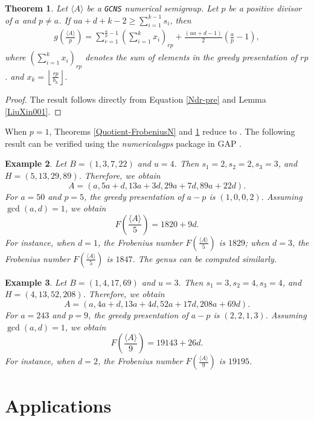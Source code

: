 \documentclass[reqno, 12pt]{article}
\newtheorem{thm}{Theorem}[section]
\theoremstyle{mydefinition}
\theoremstyle{myremark}
\newtheorem{exa}[thm]{Example}
\numberwithin{algorithm}{section}
\begin{document}
\begin{thm}\label{Quotient-Genusp}
Let $\langle A\rangle$ be a \texttt{GCNS} numerical semigroup. Let $p$ be a positive divisor of $a$ and $p\neq a$.
If $ua+d+k-2\geq \sum_{i=1}^{k-1}s_i$, then
\begin{align*}
g\left(\frac{\langle A\rangle}{p}\right)
=\sum_{r=1}^{\frac{a}{p}-1}\left(\sum_{i=1}^kx_i\right)_{rp}+\frac{(ua+d-1)}{2}\left(\frac{a}{p}-1\right),
\end{align*}
where $\left(\sum_{i=1}^{k}x_i\right)_{rp}$ denotes the sum of elements in the greedy presentation of $rp$. and $x_k=\left\lfloor \frac{rp}{b_k}\right\rfloor$.
\end{thm}
\begin{proof}
The result follows directly from Equation \eqref{Ndr-pre} and Lemma \ref{LiuXin001}.
\end{proof}


When $p=1$, Theorems \ref{Quotient-FrobeniusN} and \ref{Quotient-Genusp} reduce to \cite[Thoerems 2.12 and 2.13]{LiuSemigroupF}.
The following result can be verified using the \emph{numericalsgps} package in GAP \cite{M.Delgado}.

\begin{exa}
Let $B=(1,3,7,22)$ and $u=4$. Then $s_1=2,s_2=2,s_3=3$, and $H=(5,13,29,89)$. Therefore, we obtain
$$A=(a,5a+d,13a+3d,29a+7d,89a+22d).$$ 
For $a=50$ and $p=5$, the greedy presentation of $a-p$ is $(1,0,0,2)$.
Assuming $\gcd(a,d)=1$, we obtain
$$F\left(\frac{\langle A\rangle}{5}\right)=1820+9d.$$
For instance, when $d=1$, the Frobenius number $F\left(\frac{\langle A\rangle}{5}\right)$ is $1829$; when $d=3$, 
the Frobenius number $F\left(\frac{\langle A\rangle}{5}\right)$ is $1847$.
The genus can be computed similarly.
\end{exa}

\begin{exa}
Let $B=(1,4,17,69)$ and $u=3$. Then $s_1=3,s_2=4,s_3=4$, and $H=(4,13,52,208)$. Therefore, we obtain
$$A=(a,4a+d,13a+4d,52a+17d,208a+69d).$$ 
For $a=243$ and $p=9$, the greedy presentation of $a-p$ is $(2,2,1,3)$.
Assuming $\gcd(a,d)=1$, we obtain
$$F\left(\frac{\langle A\rangle}{9}\right)=19143+26d.$$
For instance, when $d=2$, the Frobenius number $F\left(\frac{\langle A\rangle}{9}\right)$ is $19195$.
\end{exa}


\section{Applications}\label{Section-4}
\end{document}
